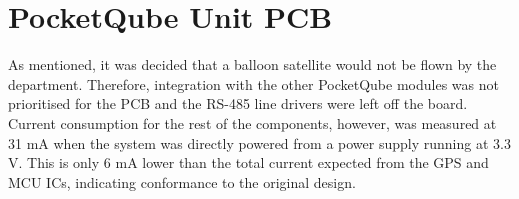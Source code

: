 \section{PocketQube Unit PCB}

As mentioned, it was decided that a balloon satellite would not be flown by the department. Therefore, integration with the other PocketQube modules was not prioritised for the PCB and the RS-485 line drivers were left off the board. Current consumption for the rest of the components, however, was measured at 31 mA when the system was directly powered from a power supply running at 3.3 V. This is only 6 mA lower than the total current expected from the GPS and MCU ICs, indicating conformance to the original design.